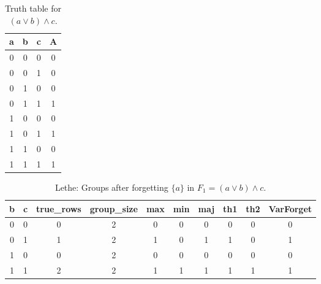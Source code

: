 \begin{table}[!tb]
    \centering
    \begin{tabular}{|c|c|c|c|}
        \hline
        \textbf{a} & \textbf{b} & \textbf{c} & \textbf{A} \\ \hline
        0 & 0 & 0 & 0 \\ \hline
        0 & 0 & 1 & 0 \\ \hline
        0 & 1 & 0 & 0 \\ \hline
        0 & 1 & 1 & 1 \\ \hline
        1 & 0 & 0 & 0 \\ \hline
        1 & 0 & 1 & 1 \\ \hline
        1 & 1 & 0 & 0 \\ \hline
        1 & 1 & 1 & 1 \\ \hline
    \end{tabular}
    \caption{Truth table for $(a \lor b) \land c$.}
    \label{tab:truthtab}
\end{table}

\begin{table}[!tb]
    \centering
    \begin{tabular}{|c|c|c|c|c|c|c|c|c|c|}
        \hline
        \textbf{b} & \textbf{c} & \textbf{true\_rows} & \textbf{group\_size} & \textbf{max} & \textbf{min} & \textbf{maj} & \textbf{th1} & \textbf{th2} & \textbf{VarForget} \\ \hline
        \rowcolor{gray!40} 0 & 0 & 0 & 2 & 0 & 0 & 0 & 0 & 0 & 0 \\ \hline
        \rowcolor{blue!40} 0 & 1 & 1 & 2 & 1 & 0 & 1 & 1 & 0 & 1 \\ \hline
        \rowcolor{red!40} 1 & 0 & 0 & 2 & 0 & 0 & 0 & 0 & 0 & 0 \\ \hline
        \rowcolor{green!40} 1 & 1 & 2 & 2 & 1 & 1 & 1 & 1 & 1 & 1 \\ \hline
    \end{tabular}
    \caption{Lethe: Groups after forgetting $\{a\}$ in $F_{1} = (a \lor b) \land c$.}
    \label{tab:lethe-F1-a-groups}
\end{table}
